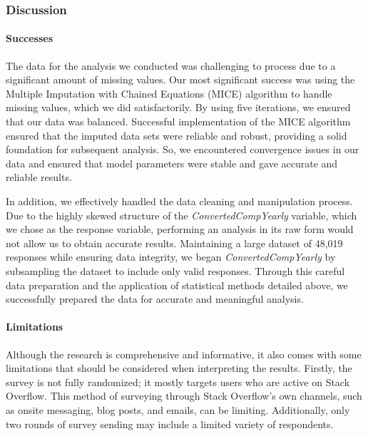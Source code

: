 \documentclass[
  12pt,
]{article}
\begin{document}
\hypertarget{discussion}{%
\subsubsection{Discussion}\label{discussion}}

\hypertarget{successes}{%
\paragraph{Successes}\label{successes}}

The data for the analysis we conducted was challenging to process due to
a significant amount of missing values. Our most significant success was
using the Multiple Imputation with Chained Equations (MICE) algorithm to
handle missing values, which we did satisfactorily. By using five
iterations, we ensured that our data was balanced. Successful
implementation of the MICE algorithm ensured that the imputed data sets
were reliable and robust, providing a solid foundation for subsequent
analysis. So, we encountered convergence issues in our data and ensured
that model parameters were stable and gave accurate and reliable
results.

In addition, we effectively handled the data cleaning and manipulation
process. Due to the highly skewed structure of the
\emph{ConvertedCompYearly} variable, which we chose as the response
variable, performing an analysis in its raw form would not allow us to
obtain accurate results. Maintaining a large dataset of 48,019 responses
while ensuring data integrity, we began \emph{ConvertedCompYearly} by
subsampling the dataset to include only valid responses. Through this
careful data preparation and the application of statistical methods
detailed above, we successfully prepared the data for accurate and
meaningful analysis.

\hypertarget{limitations}{%
\paragraph{Limitations}\label{limitations}}

Although the research is comprehensive and informative, it also comes
with some limitations that should be considered when interpreting the
results. Firstly, the survey is not fully randomized; it mostly targets
users who are active on Stack Overflow. This method of surveying through
Stack Overflow's own channels, such as onsite messaging, blog posts, and
emails, can be limiting. Additionally, only two rounds of survey sending
may include a limited variety of respondents.
\end{document}

